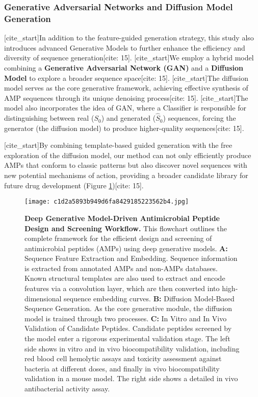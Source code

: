 \documentclass{article}
\begin{document}
\subsubsection{Generative Adversarial Networks and Diffusion Model Generation}
[cite_start]In addition to the feature-guided generation strategy, this study also introduces advanced Generative Models to further enhance the efficiency and diversity of sequence generation[cite: 15]. [cite_start]We employ a hybrid model combining a \textbf{Generative Adversarial Network (GAN)} and a \textbf{Diffusion Model} to explore a broader sequence space[cite: 15]. [cite_start]The diffusion model serves as the core generative framework, achieving effective synthesis of AMP sequences through its unique denoising process[cite: 15]. [cite_start]The model also incorporates the idea of GAN, where a Classifier is responsible for distinguishing between real ($S_0$) and generated ($\hat{S}_0$) sequences, forcing the generator (the diffusion model) to produce higher-quality sequences[cite: 15].

[cite_start]By combining template-based guided generation with the free exploration of the diffusion model, our method can not only efficiently produce AMPs that conform to classic patterns but also discover novel sequences with new potential mechanisms of action, providing a broader candidate library for future drug development (Figure \ref{fig:process})[cite: 15].

\begin{figure}[htbp]
    \centering
    \texttt{[image: c1d2a5893b949d6fa8429185223562b4.jpg]} %
    \caption{\textbf{Deep Generative Model-Driven Antimicrobial Peptide Design and Screening Workflow.} This flowchart outlines the complete framework for the efficient design and screening of antimicrobial peptides (AMPs) using deep generative models. \textbf{A:} Sequence Feature Extraction and Embedding. Sequence information is extracted from annotated AMPs and non-AMPs databases. Known structural templates are also used to extract and encode features via a convolution layer, which are then converted into high-dimensional sequence embedding curves. \textbf{B:} Diffusion Model-Based Sequence Generation. As the core generative module, the diffusion model is trained through two processes. \textbf{C:} In Vitro and In Vivo Validation of Candidate Peptides. Candidate peptides screened by the model enter a rigorous experimental validation stage. The left side shows in vitro and in vivo biocompatibility validation, including red blood cell hemolytic assays and toxicity assessment against bacteria at different doses, and finally in vivo biocompatibility validation in a mouse model. The right side shows a detailed in vivo antibacterial activity assay.}
    \label{fig:process}
\end{figure}
\pagebreak
\end{document}
